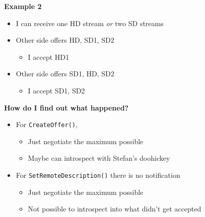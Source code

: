 \documentclass[helvetica]{seminar}
\newcommand{\heading}[1]{%
  \begin{center} 
    \large\bf 
    #1 
  \end{center} 
  \vspace{.4 in}}
\begin{document}


\begin{slide}
\heading{Example 2}

\begin{itemize}
\item I can receive one HD stream \emph{or} two SD streams
\item Other side offers HD, SD1, SD2
  \begin{itemize}
    \item I accept HD1
  \end{itemize}

\item Other side offers SD1, HD, SD2
  \begin{itemize}
    \item I accept SD1, SD2
  \end{itemize}
\end{itemize}

\end{slide}


\begin{slide}
\heading{How do I find out what happened?}

\begin{itemize}
\item For \verb^CreateOffer()^, 
  \begin{itemize}
  \item Just negotiate the maximum possible
    \item Maybe can introspect with Stefan's doohickey
  \end{itemize}

\item For \verb^SetRemoteDescription()^ there is no notification
  \begin{itemize}
    \item Just negotiate the maximum possible
    \item Not possible to introspect into what didn't get accepted
  \end{itemize}
\end{itemize}

\end{slide}
\end{document}
